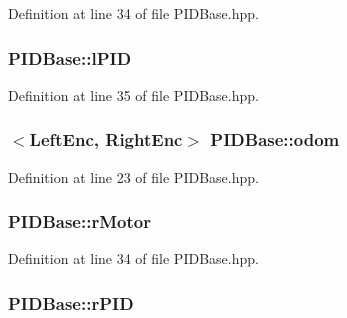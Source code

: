 Definition at line 34 of file P\-I\-D\-Base.\-hpp.

\hypertarget{classPIDBase_a7e39df880dd6279479e77febe800a6ba}{
\subsubsection[{l\-P\-I\-D}]{ P\-I\-D\-Base\-::l\-P\-I\-D\hspace{0.3cm}{\ttfamily [private]}}}\label{classPIDBase_a7e39df880dd6279479e77febe800a6ba}


Definition at line 35 of file P\-I\-D\-Base.\-hpp.

\hypertarget{classPIDBase_a3adee9b84ba975616f672a7620ac16b8}{
\subsubsection[{odom}]{$<${\bf Left\-Enc}, {\bf Right\-Enc}$>$ P\-I\-D\-Base\-::odom}}\label{classPIDBase_a3adee9b84ba975616f672a7620ac16b8}


Definition at line 23 of file P\-I\-D\-Base.\-hpp.

\hypertarget{classPIDBase_ae52cf8a147c90af4334e1ad14f48aa4a}{
\subsubsection[{r\-Motor}]{ P\-I\-D\-Base\-::r\-Motor\hspace{0.3cm}{\ttfamily [private]}}}\label{classPIDBase_ae52cf8a147c90af4334e1ad14f48aa4a}


Definition at line 34 of file P\-I\-D\-Base.\-hpp.

\hypertarget{classPIDBase_a940d3dae6038a472ea613c03c5be3846}{
\subsubsection[{r\-P\-I\-D}]{ P\-I\-D\-Base\-::r\-P\-I\-D\hspace{0.3cm}{\ttfamily [private]}}}\label{classPIDBase_a940d3dae6038a472ea613c03c5be3846}


